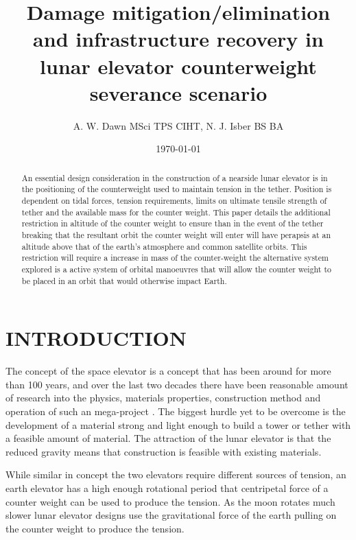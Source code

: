 \documentclass[twocolumn,prl,nobalancelastpage,aps,10pt]{revtex4-1}
\begin{document}
\title{Damage mitigation/elimination and infrastructure recovery in lunar elevator counterweight severance scenario}

\author{A. W. Dawn MSci TPS CIHT, N. J. Isber BS BA}


\begin{abstract} An essential design consideration in the construction of a nearside lunar elevator is in the positioning of the counterweight used to maintain tension in the tether. Position is dependent on tidal forces, tension requirements, limits on ultimate tensile strength of tether and the available mass for the counter weight. This paper details the additional restriction in altitude of the counter weight to ensure than in the event of the tether breaking that the resultant orbit the counter weight will enter will have perapsis at an altitude above that of the earth's atmosphere and common satellite orbits. This restriction will require a increase in mass of the counter-weight the alternative system explored is a active system of orbital manoeuvres that will allow the counter weight to be placed in an orbit that would otherwise impact Earth.

\end{abstract}
\date{\today}

\maketitle

\section{INTRODUCTION}

The concept of the space elevator is a concept that has been around for more than 100 years, and over the last two decades there have been reasonable amount of research into the physics, materials properties, construction method and operation of such an mega-project \cite{Aravind}. The biggest hurdle yet to be overcome is the development of a material strong and light enough to build a tower or tether with a feasible amount of material. The attraction of the lunar elevator is that the reduced gravity means that construction is feasible with existing materials.

While similar in concept the two elevators require different sources of tension, an earth elevator has a high enough rotational period that centripetal force of a counter weight can be used to produce the tension. As the moon rotates much slower lunar elevator designs use the gravitational force of the earth pulling on the counter weight to produce the tension.
\end{document}
